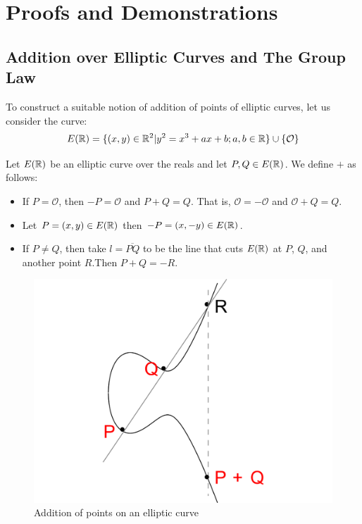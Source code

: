 \chapter{Proofs and Demonstrations}

\section{Addition over Elliptic Curves and The Group Law}

\hspace{10mm} To construct a suitable notion of addition of points of elliptic curves, let us consider the curve:
\begin{equation}
    E(\mathbb{R})=\{(x,y) \in \mathbb{R}^2 | y^2=x^3+ax+b; a,b \in \mathbb{R}\} \cup \{\mathcal{O}\}
\end{equation}

\begin{definition}
Let $E(\mathbb{R})$ be an elliptic curve over the reals and let $P,Q \in E(\mathbb{R})$. We define $+$ as follows:
\begin{itemize}
    \item If $P=\mathcal{O}$, then $-P=\mathcal{O}$ and $P+Q=Q$. That is, $\mathcal{O}=-\mathcal{O}$ and $\mathcal{O}+Q=Q$.
    
    \item Let $P=(x,y) \in E(\mathbb{R})$ then $-P=(x,-y) \in E(\mathbb{R})$.
    
    \item If $P \neq Q$, then take $l=\overline{PQ}$ to be the line that cuts $E(\mathbb{R})$ at $P$, $Q$, and another point $R$.Then $P+Q=-R$.
\end{itemize}
\end{definition}

\begin{figure}
    \centering
    \includegraphics{Figures/EllipticCurveAddition.jpg}
    \caption{Addition of points on an elliptic curve}
    \label{fig:my_label}
\end{figure}

